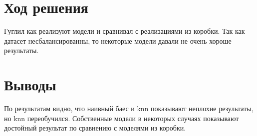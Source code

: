 \documentclass[12pt]{article}
\begin{document}
\section{Ход решения}

Гуглил как реализуют модели и сравнивал с реализациями из коробки. Так как датасет несбалансированны, то некоторые модели давали не очень хороше результаты.
\section{Выводы}
По результатам видно, что наивный баес и knn показывают неплохие результаты, но knn переобучился. Собственные модели в некоторых случаях показывают достойный результат по сравнению с моделями из коробки.
\end{document}
